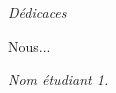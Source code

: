 \begin{center}
\Huge{\emph{Dédicaces}}
\end{center}

\vspace{1cm}

Nous...


\vspace{3cm}
\begin{flushright}
	\textit{Nom étudiant 1.}
\end{flushright}
